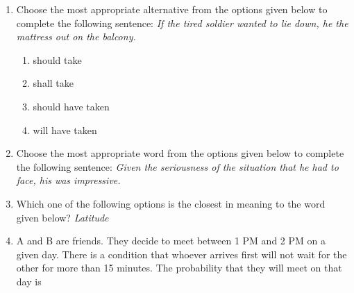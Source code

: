 \documentclass[journal,12pt,onecolumn]{IEEEtran}
\theoremstyle{remark}
\begin{document}
\begin{enumerate}[start=1, label=Q.\arabic*]
\item Choose the most appropriate alternative from the options given below to complete the following sentence: \textit{If the tired soldier wanted to lie down, he \underline{\hspace{2cm}} the mattress out on the balcony.}

\begin{enumerate}
    \item should take
    \item shall take
    \item should have taken
    \item will have taken
\end{enumerate}
\hfill{}

\item Choose the most appropriate word from the options given below to complete the following sentence: \textit{Given the seriousness of the situation that he had to face, his \underline{\hspace{2cm}} was impressive.}

\begin{enumerate}
\end{enumerate}
\hfill{}

\item Which one of the following options is the closest in meaning to the word given below? \textit{Latitude}

\begin{enumerate}
\end{enumerate}
\hfill{}

\item A and B are friends. They decide to meet between 1 PM and 2 PM on a given day. There is a condition that whoever arrives first will not wait for the other for more than 15 minutes. The probability that they will meet on that day is


\end{enumerate}
\end{document}
